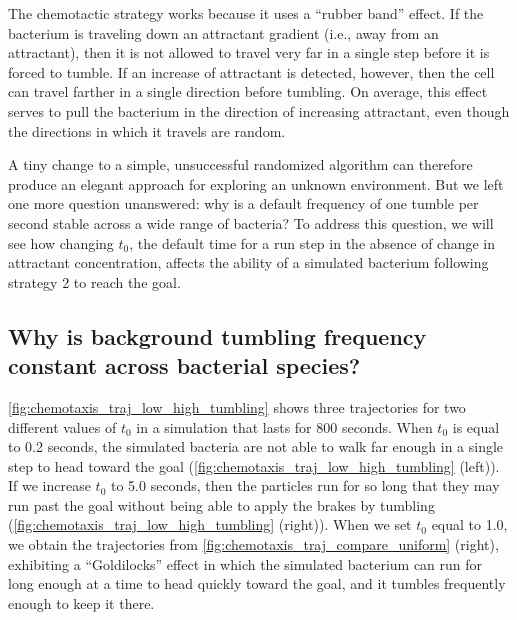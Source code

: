 The chemotactic strategy works because it uses a ``rubber band'' effect. If the bacterium is traveling down an attractant gradient (i.e., away from an attractant), then it is not allowed to travel very far in a single step before it is forced to tumble. If an increase of attractant is detected, however, then the cell can travel farther in a single direction before tumbling. On average, this effect serves to pull the bacterium in the direction of increasing attractant, even though the directions in which it travels are random.

A tiny change to a simple, unsuccessful randomized algorithm can therefore produce an elegant approach for exploring an unknown environment. But we left one more question unanswered: why is a default frequency of one tumble per second stable across a wide range of bacteria? To address this question, we will see how changing $t_0$, the default time for a run step in the absence of change in attractant concentration, affects the ability of a simulated bacterium following strategy 2 to reach the goal.

\FloatBarrier
{}
\subsection{Why is background tumbling frequency constant across bacterial species?}

\autoref{fig:chemotaxis_traj_low_high_tumbling} shows three trajectories for two different values of $t_0$ in a simulation that lasts for 800 seconds. When $t_0$ is equal to 0.2 seconds, the simulated bacteria are not able to walk far enough in a single step to head toward the goal (\autoref{fig:chemotaxis_traj_low_high_tumbling} (left)). If we increase $t_0$ to 5.0 seconds, then the particles run for so long that they may run past the goal without being able to apply the brakes by tumbling (\autoref{fig:chemotaxis_traj_low_high_tumbling} (right)). When we set $t_0$ equal to 1.0, we obtain the trajectories from \autoref{fig:chemotaxis_traj_compare_uniform} (right), exhibiting a ``Goldilocks'' effect in which the simulated bacterium can run for long enough at a time to head quickly toward the goal, and it tumbles frequently enough to keep it there.\\

